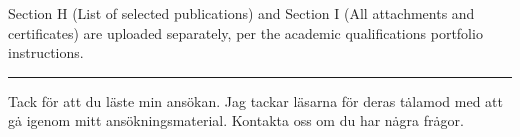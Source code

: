 


\maketitle

\tableofcontents

\vspace{1cm}
\noindent Section H (List of selected publications) and Section I (All attachments and certificates) are uploaded separately, per the academic qualifications portfolio instructions.
\vspace{0.5em}
\hrule
\vspace{0.5em}
\noindent Tack f\"or att du l\"aste min ans\"okan.
\noindent Jag tackar l\"asarna f\"or deras t\.alamod med att g\.a igenom mitt ans\"okningsmaterial. Kontakta oss om du har n\.agra fr\.agor.



{
	\renewcommand\thesection{\roman{section}}
	\setlength\parindent{0pt}
	
}



{
	\setlength\parindent{0pt}
	
}












